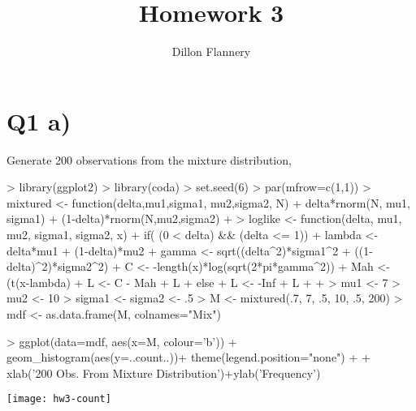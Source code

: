\documentclass{article}
\title{Homework 3}
\author{Dillon Flannery	}
\begin{document}
\maketitle


\section*{Q1 a)}
Generate 200 observations from the mixture distribution, 
\begin{Schunk}
\begin{Sinput}
> library(ggplot2)
> library(coda)
> set.seed(6)
> par(mfrow=c(1,1))
> mixtured <- function(delta,mu1,sigma1, mu2,sigma2, N){
+   delta*rnorm(N, mu1, sigma1) + (1-delta)*rnorm(N,mu2,sigma2)
+ }
> loglike <- function(delta, mu1, mu2, sigma1, sigma2, x){
+   if( (0 < delta) && (delta <= 1)){
+     lambda <- delta*mu1 + (1-delta)*mu2
+     gamma <- sqrt((delta^2)*sigma1^2 + ((1-delta)^2)*sigma2^2)
+     C <- -length(x)*log(sqrt(2*pi*gamma^2))
+     Mah <- (t(x-lambda)%*%(x-lambda))/(2*gamma^2)
+     L <- C - Mah 
+     L    
+   }else{
+     L <- -Inf
+     L
+   }
+ }
> mu1 <- 7
> mu2 <- 10
> sigma1 <- sigma2 <- .5
> M <- mixtured(.7, 7, .5, 10, .5, 200)
> mdf <- as.data.frame(M, colnames="Mix")
\end{Sinput}
\end{Schunk}
\begin{Schunk}
\begin{Sinput}
> ggplot(data=mdf, aes(x=M, colour='b')) + geom_histogram(aes(y=..count..))+ theme(legend.position="none") +
+   xlab('200 Obs. From Mixture Distribution')+ylab('Frequency')
\end{Sinput}
\end{Schunk}
\texttt{[image: hw3-count]}
\end{document}
